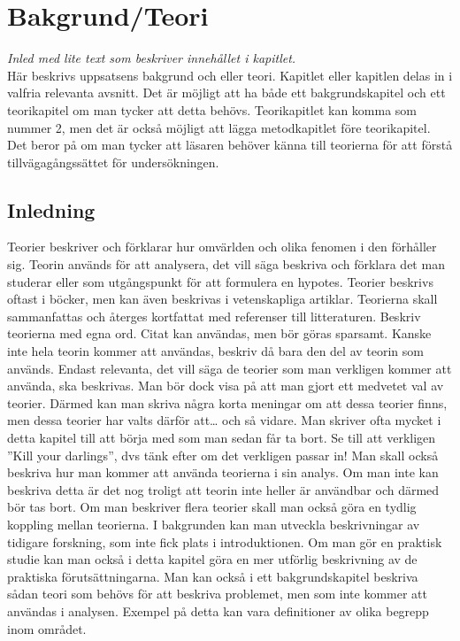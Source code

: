 \documentclass[a4paper,12pt]{article} %
\begin{document}
\newpage

\section{Bakgrund/Teori}
\emph{Inled med lite text som beskriver innehållet i kapitlet.}\\
Här beskrivs uppsatsens bakgrund och eller teori. Kapitlet eller kapitlen delas in i valfria relevanta avsnitt. Det är möjligt att ha både ett bakgrundskapitel och ett teorikapitel om man tycker att detta behövs. Teorikapitlet kan komma som nummer 2, men det är också möjligt att lägga metodkapitlet före teorikapitel. Det beror på om man tycker att läsaren behöver känna till teorierna för att förstå tillvägagångssättet för undersökningen.

\subsection{Inledning}
Teorier beskriver och förklarar hur omvärlden och olika fenomen i den förhåller sig. Teorin används för att analysera, det vill säga beskriva och förklara det man studerar eller som utgångspunkt för att formulera en hypotes. Teorier beskrivs oftast i böcker, men kan även beskrivas i vetenskapliga artiklar.
Teorierna skall sammanfattas och återges kortfattat med referenser till litteraturen. Beskriv teorierna med egna ord. Citat kan användas, men bör göras sparsamt. Kanske inte hela teorin kommer att användas, beskriv då bara den del av teorin som används. Endast relevanta, det vill säga de teorier som man verkligen kommer att använda, ska beskrivas. Man bör dock visa på att man gjort ett medvetet val av teorier. Därmed kan man skriva några korta meningar om att dessa teorier finns, men dessa teorier har valts därför att… och så vidare. Man skriver ofta mycket i detta kapitel till att börja med som man sedan får ta bort. Se till att verkligen ”Kill your darlings”, dvs tänk efter om det verkligen passar in! Man skall också beskriva hur man kommer att använda teorierna i sin analys. Om man inte kan beskriva detta är det nog troligt att teorin inte heller är användbar och därmed bör tas bort. Om man beskriver flera teorier skall man också göra en tydlig koppling mellan teorierna.
I bakgrunden kan man utveckla beskrivningar av tidigare forskning, som inte fick plats i introduktionen. Om man gör en praktisk studie kan man också i detta kapitel göra en mer utförlig beskrivning av de praktiska förutsättningarna. Man kan också i ett bakgrundskapitel beskriva sådan teori som behövs för att beskriva problemet, men som inte kommer att användas i analysen. Exempel på detta kan vara definitioner av olika begrepp inom området.
\end{document}
